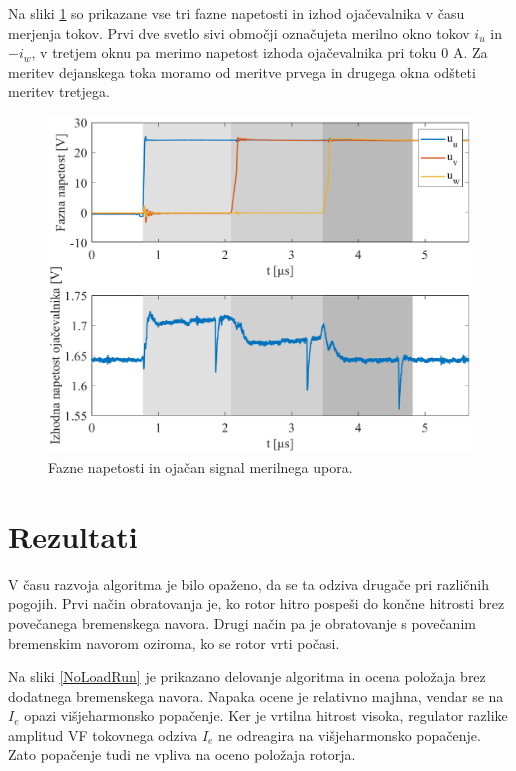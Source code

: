 \documentclass[a4paper,twoside,openright,12pt,slovene]{book}
\begin{document}
Na sliki \ref{fazeInShunt} so prikazane vse tri fazne napetosti in izhod ojačevalnika v času merjenja tokov. Prvi dve svetlo sivi območji označujeta merilno okno tokov $i_u$ in $- i_w$, v tretjem oknu pa merimo napetost
izhoda ojačevalnika pri toku 0 A. Za meritev dejanskega toka moramo od meritve prvega in drugega okna odšteti meritev tretjega.

\begin{figure}[!htbp]
    \centering
    \includegraphics[width=1\columnwidth]{Slike/fazeInShunt.eps}
    \caption{\label{fazeInShunt} Fazne napetosti in ojačan signal merilnega upora. }
\end{figure}

\newpage
\section{Rezultati} \label{rezultati}

V času razvoja algoritma je bilo opaženo, da se ta odziva drugače pri različnih pogojih. Prvi način obratovanja je, ko rotor hitro pospeši do končne hitrosti brez povečanega bremenskega navora. Drugi
način pa je obratovanje s povečanim bremenskim navorom oziroma, ko se rotor vrti počasi. 

Na sliki \ref{NoLoadRun} je prikazano delovanje algoritma in ocena položaja brez dodatnega bremenskega navora. Napaka ocene je relativno majhna, vendar se na $I_e$ opazi višjeharmonsko popačenje.
Ker je vrtilna hitrost visoka, regulator razlike amplitud VF tokovnega odziva $I_e$ ne odreagira na višjeharmonsko popačenje. Zato popačenje tudi ne vpliva na oceno položaja rotorja.
\end{document}
